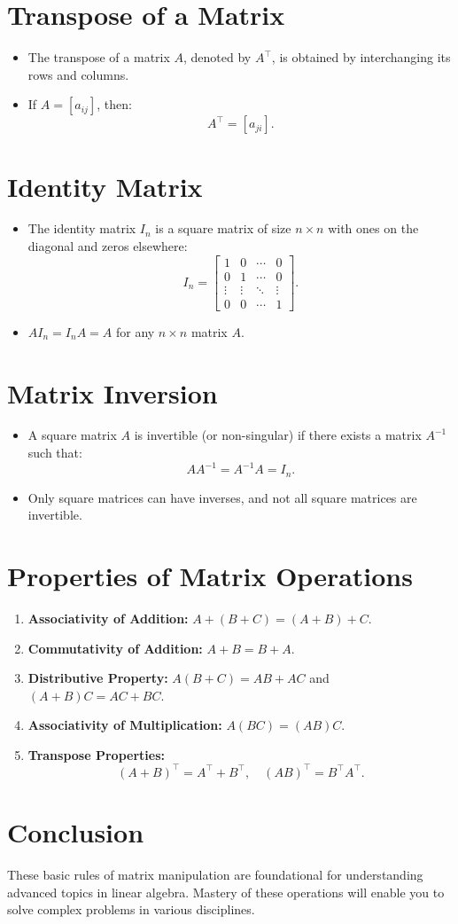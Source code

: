 \documentclass[12pt]{article}
\begin{document}
\section*{Transpose of a Matrix}
\begin{itemize}
    \item The transpose of a matrix \( A \), denoted by \( A^\top \), is obtained by interchanging its rows and columns.
    \item If \( A = [a_{ij}] \), then:
    \[
    A^\top = [a_{ji}].
    \]
\end{itemize}

\section*{Identity Matrix}
\begin{itemize}
    \item The identity matrix \( I_n \) is a square matrix of size \( n \times n \) with ones on the diagonal and zeros elsewhere:
    \[
    I_n = 
    \begin{bmatrix}
    1 & 0 & \cdots & 0 \\
    0 & 1 & \cdots & 0 \\
    \vdots & \vdots & \ddots & \vdots \\
    0 & 0 & \cdots & 1
    \end{bmatrix}.
    \]
    \item \( AI_n = I_nA = A \) for any \( n \times n \) matrix \( A \).
\end{itemize}

\section*{Matrix Inversion}
\begin{itemize}
    \item A square matrix \( A \) is invertible (or non-singular) if there exists a matrix \( A^{-1} \) such that:
    \[
    AA^{-1} = A^{-1}A = I_n.
    \]
    \item Only square matrices can have inverses, and not all square matrices are invertible.
\end{itemize}

\section*{Properties of Matrix Operations}
\begin{enumerate}
    \item \textbf{Associativity of Addition:} \( A + (B + C) = (A + B) + C \).
    \item \textbf{Commutativity of Addition:} \( A + B = B + A \).
    \item \textbf{Distributive Property:} \( A(B + C) = AB + AC \) and \( (A + B)C = AC + BC \).
    \item \textbf{Associativity of Multiplication:} \( A(BC) = (AB)C \).
    \item \textbf{Transpose Properties:}
    \[
    (A + B)^\top = A^\top + B^\top, \quad (AB)^\top = B^\top A^\top.
    \]
\end{enumerate}

\section*{Conclusion}
These basic rules of matrix manipulation are foundational for understanding advanced topics in linear algebra. Mastery of these operations will enable you to solve complex problems in various disciplines.
\end{document}
